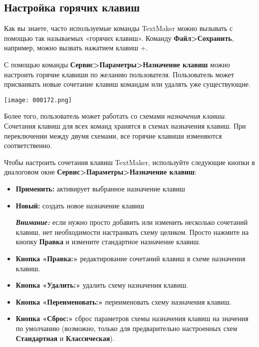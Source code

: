 ﻿\documentclass[a4paper,10pt]{article}
\begin{document}
 \subsection{Настройка горячих клавиш} \label{sec:настргорклавиш}
 Как вы знаете, часто используемые команды TextMaker можно вызывать с помощью так называемых «горячих клавиш». Команду \textbf{Файл>Сохранить}, например, можно вызвать нажатием клавиш +.
 
 С помощью команды \textbf{Сервис>Параметры>Назначение клавиш} можно настроить горячие клавиши по желанию пользователя. Пользователь может присваивать новые сочетание клавиш командам или удалять уже существующие.
 
 \texttt{[image: 000172.png]}
 
 Более того, пользователь может работать со схемами \textit{назначения клавиш}. Сочетания клавиш для всех команд хранятся в схемах назначения клавиш. При переключении между двумя схемами, все горячие клавиши изменяются соответственно.
 
 Чтобы настроить сочетания клавиш TextMaker, используйте следующие кнопки в диалоговом окне \textbf{Сервис>Параметры>Назначение клавиш}:
 
 \begin{itemize}
  \item \textbf{Применить:} активирует выбранное назначение клавиш
  \item \textbf{Новый:} создать новое назначение клавиш
  
  \begin{mdframed}[backgroundcolor=blue!10]
\textbf{\textit{Внимание:}} если нужно просто добавить или изменить несколько сочетаний клавиш, нет необходимости настраивать схему целиком. Просто нажмите на кнопку \textbf{Правка} и измените стандартное назначение клавиш.
\end{mdframed}
\item \textbf{Кнопка «Правка:»} редактирование сочетаний клавиш в схеме назначения клавиш.
\item \textbf{Кнопка «Удалить:»} удалить схему назначения клавиш.
\item \textbf{Кнопка «Переименовать:»} переименовать схему назначения клавиш.
\item \textbf{Кнопка «Сброс:»} сброс параметров схемы назначения клавиш на значения по умолчанию (возможно, только для предварительно настроенных схем \textbf{Стандартная} и \textbf{Классическая}).
 \end{itemize}
\end{document}
